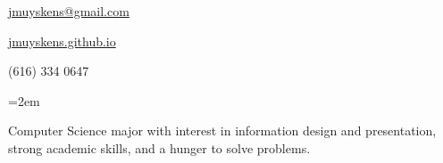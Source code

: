 \documentclass{scrartcl}
\newlength{\datebox}\settowidth{\datebox}{Spring 2011} %
\newcommand{\NewEntry}[3]{\noindent\hangindent=2em\hangafter=0 \parbox{\datebox}{\small \textit{#1}}\hspace{1.0em} #2 #3 %
\vspace{0.2em}} %
\newcommand{\Description}[1]{\hangindent=2em\hangafter=0\noindent\raggedright\footnotesize{#1}\par\normalsize\vspace{1em}} %
\begin{document}
\thispagestyle{empty} %


\begin{cv}{}%
\noindent \hrulefill




\hfill \href{mailto:jmuyskens@gmail.com}{jmuyskens@gmail.com} %

\hfill \href{http://jmuyskens.github.io}{jmuyskens.github.io} %

\hfill (616) 334 0647 %


%
%



\noindent{}

\vspace{1em}

\Description{Computer Science major with interest in information design and presentation, strong academic skills, and a hunger to solve problems.}



\end{cv}
\end{document}

